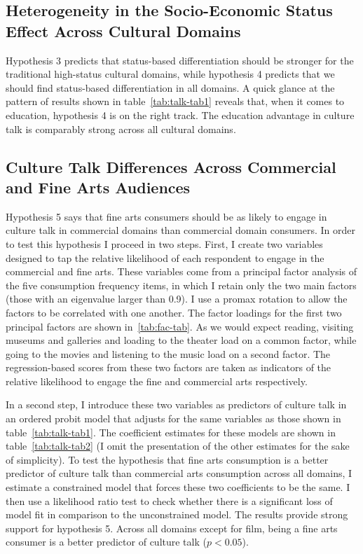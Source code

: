 \subsection{Heterogeneity in the Socio-Economic Status Effect Across Cultural Domains}
Hypothesis 3 predicts that status-based differentiation should be stronger for the traditional high-status cultural domains, while hypothesis 4 predicts that we should find status-based differentiation in all domains.  A quick glance at the pattern of results shown in table~\ref{tab:talk-tab1} reveals that, when it comes to education, hypothesis 4 is on the right track. The education advantage in culture talk is comparably strong across all cultural domains. 

\subsection{Culture Talk Differences Across Commercial and Fine Arts Audiences}
Hypothesis 5 says that fine arts consumers should be as likely to engage in culture talk in commercial domains than commercial domain consumers. In order to test this hypothesis I proceed in two steps. First, I create two variables designed to tap the relative likelihood of each respondent to engage in the commercial and fine arts. These variables come from a principal factor analysis of the five consumption frequency items, in which I retain only the two main factors (those with an eigenvalue larger than 0.9). I use a promax rotation to allow the factors to be correlated with one another. The factor loadings for the first two principal factors are shown in~\ref{tab:fac-tab}. As we would expect reading, visiting museums and galleries and loading to the theater load on a common factor, while going to the movies and listening to the music load on a second factor. The regression-based scores from these two factors are taken as indicators of the relative likelihood to engage the fine and commercial arts respectively.

In a second step, I introduce these two variables as predictors of culture talk in an ordered probit model that adjusts for the same variables as those shown in table~\ref{tab:talk-tab1}. The coefficient estimates for these models are shown in table~\ref{tab:talk-tab2} (I omit the presentation of the other estimates for the sake of simplicity). To test the hypothesis that fine arts consumption is a better predictor of culture talk than commercial arts consumption across all domains, I estimate a constrained model that forces these two coefficients to be the same. I then use a likelihood ratio test to check whether there is a significant loss of model fit in comparison to the unconstrained model. The results provide strong support for hypothesis 5. Across all domains except for film, being a fine arts consumer is a better predictor of culture talk ($p<0.05$). 